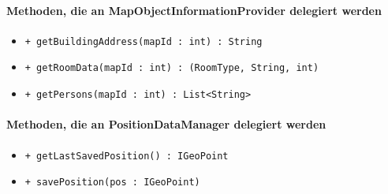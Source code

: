 \paragraph*{Methoden, die an MapObjectInformationProvider delegiert werden}
\begin{itemize}
    \item \texttt{+ getBuildingAddress(mapId : int) : String}
    \item \texttt{+ getRoomData(mapId : int) : (RoomType, String, int)}
    \item \texttt{+ getPersons(mapId : int) : List<String>}
\end{itemize}

\paragraph*{Methoden, die an PositionDataManager delegiert werden}
\begin{itemize}
    \item \texttt{+ getLastSavedPosition() : IGeoPoint}
    \item \texttt{+ savePosition(pos : IGeoPoint)}
\end{itemize}
